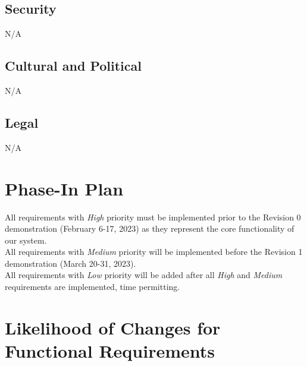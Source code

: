 \documentclass[12pt]{article}
\begin{document}
\subsection{Security}
N/A
\subsection{Cultural and Political}
N/A
\subsection{Legal}
N/A

\section{Phase-In Plan}
All requirements with \textit{High} priority must be implemented prior to the Revision 0 demonstration (February 6-17, 2023) as they represent the core functionality of our system.
\\All requirements with \textit{Medium} priority will be implemented before the Revision 1 demonstration (March 20-31, 2023). 
\\All requirements with \textit{Low} priority will be added after all \textit{High} and \textit{Medium} requirements are implemented, time permitting.


\newpage
\section{Likelihood of Changes for Functional Requirements}    
\end{document}

